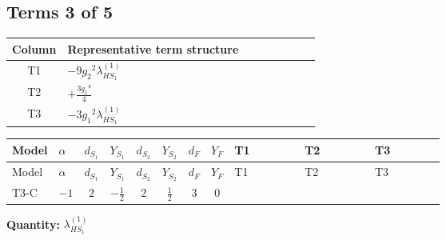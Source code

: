 \documentclass[8pt]{article}
\begin{document}
\begin{landscape}
\subsection*{Terms 3 of 5}
\begin{center}
\begin{tabular}{@{}c >{\raggedright\arraybackslash}p{0.82\linewidth}@{}}
\toprule
Column & Representative term structure \\
\midrule
T1 & \(\displaystyle -9 {g_2}^2 {\lambda_{HS_1}^{(1)}}\) \\
\midrule
T2 & \(\displaystyle +\frac{3 {g_1}^4}{4}\) \\
\midrule
T3 & \(\displaystyle -3 {g_1}^2 {\lambda_{HS_1}^{(1)}}\) \\
\midrule
\bottomrule
\end{tabular}
\end{center}
\smallskip
\tiny
\begin{longtable}{@{}llcccccc >{\raggedright\arraybackslash}p{0.21\linewidth} >{\raggedright\arraybackslash}p{0.21\linewidth} >{\raggedright\arraybackslash}p{0.21\linewidth}@{}}
\toprule
Model & $\alpha$ & $d_{S_1}$ & $Y_{S_1}$ & $d_{S_2}$ & $Y_{S_2}$ & $d_F$ & $Y_F$ & T1 & T2 & T3 \\
\midrule
\endfirsthead
\toprule
Model & $\alpha$ & $d_{S_1}$ & $Y_{S_1}$ & $d_{S_2}$ & $Y_{S_2}$ & $d_F$ & $Y_F$ & T1 & T2 & T3 \\
\midrule
\endhead
T3-C & $-1$ & $2$ & $-\frac{1}{2}$ & $2$ & $\frac{1}{2}$ & $3$ & $0$ & \scriptsize\adjustbox{max width=\linewidth}{$\begin{gathered} -9 {g_2}^2 {\lambda_{HS_1}^{(1)}}\end{gathered}$} & \scriptsize\adjustbox{max width=\linewidth}{$\begin{gathered} +\frac{3 {g_1}^4}{4}\end{gathered}$} & \scriptsize\adjustbox{max width=\linewidth}{$\begin{gathered} -3 {g_1}^2 {\lambda_{HS_1}^{(1)}}\end{gathered}$} \\
\midrule
\bottomrule
\end{longtable}
\clearpage
\noindent\textbf{Quantity: }$\lambda_{HS_1}^{(1)}$\par\smallskip

\end{landscape}
\end{document}
